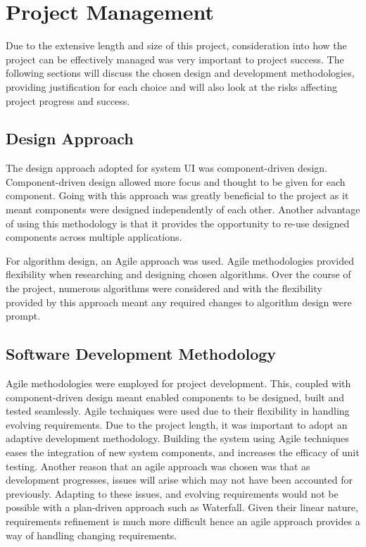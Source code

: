 \chapter{Project Management}
\label{Chapter:ProjectManagement}
Due to the extensive length and size of this project, consideration into how the project can be effectively
managed was very important to project success. The following sections will discuss the chosen design and development methodologies, providing justification for each choice and will also look at the risks affecting project progress and success.

\section{Design Approach}
The design approach adopted for system UI was component-driven design. Component-driven design allowed more focus and thought to be given for each component. Going with this approach was greatly beneficial to the project as it meant components were designed independently of each other. Another advantage of using this methodology is that it provides the opportunity to re-use designed components across multiple applications. 

For algorithm design, an Agile approach was used. Agile methodologies provided flexibility when researching and designing chosen algorithms. Over the course of the project, numerous algorithms were considered and with the flexibility provided by this approach meant any required changes to algorithm design were prompt.

\section{Software Development Methodology}
Agile methodologies were employed for project development. This, coupled with component-driven design meant enabled components to be designed, built and tested seamlessly. Agile techniques were used due to their flexibility in handling evolving requirements. Due to the project length, it was important to adopt an adaptive development methodology. Building the system using Agile techniques eases the integration of new system components, and increases the efficacy of unit testing. Another reason that an agile approach was chosen was that as development progresses, issues will arise which may not have been accounted for previously. Adapting to these issues, and evolving requirements would not be possible with a plan-driven approach such as Waterfall. Given their linear nature, requirements refinement is much more difficult hence an agile approach provides a way of handling changing requirements. 

